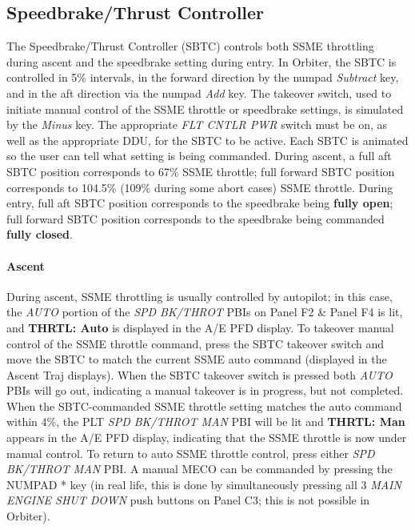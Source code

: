 \documentclass[Space_Shuttle_Vessel_Manual.tex]{subfiles}
\begin{document}
\begin{multicols*}{2}
\subsection{Speedbrake/Thrust Controller}
The Speedbrake/Thrust Controller (SBTC) controls both SSME throttling during ascent and the speedbrake setting during entry. In Orbiter, the SBTC is controlled in 5\% intervals, in the forward direction by the numpad \textit{Subtract} key, and in the aft direction via the numpad \textit{Add} key. The takeover switch, used to initiate manual control of the SSME throttle or speedbrake settings, is simulated by the \textit{Minus} key. The appropriate \textit{FLT CNTLR PWR} switch must be on, as well as the appropriate DDU, for the SBTC to be active. Each SBTC is animated so the user can tell what setting is being commanded. During ascent, a full aft SBTC position corresponds to 67\% SSME throttle; full forward SBTC position corresponds to 104.5\% (109\% during some abort cases) SSME throttle. During entry, full aft SBTC position corresponds to the speedbrake being \textbf{fully open}; full forward SBTC position corresponds to the speedbrake being commanded \textbf{fully closed}.

\paragraph{Ascent}
During ascent, SSME throttling is usually controlled by autopilot; in this case, the \textit{AUTO} portion of the \textit{SPD BK/THROT} PBIs on Panel F2 \& Panel F4 is lit, and \textbf{THRTL: Auto} is displayed in the A/E PFD display. To takeover manual control of the SSME throttle command, press the SBTC takeover switch and move the SBTC to match the current SSME auto command (displayed in the Ascent Traj displays). When the SBTC takeover switch is pressed both \textit{AUTO} PBIs will go out, indicating a manual takeover is in progress, but not completed. When the SBTC-commanded SSME throttle setting matches the auto command within 4\%, the PLT \textit{SPD BK/THROT MAN} PBI will be lit and \textbf{THRTL: Man} appears in the A/E PFD display, indicating that the SSME throttle is now under manual control. To return to auto SSME throttle control, press either \textit{SPD BK/THROT MAN} PBI. A manual MECO can be commanded by pressing the NUMPAD * key (in real life, this is done by simultaneously pressing all 3 \textit{MAIN ENGINE SHUT DOWN} push buttons on Panel C3; this is not possible in Orbiter).


\end{multicols*}
\end{document}
